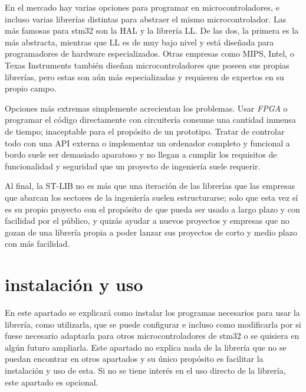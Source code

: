 \documentclass{report}
\begin{document}
En el mercado hay varias opciones para programar en microcontroladores, e incluso varias librerías distintas para abstraer el mismo microcontrolador. Las más famosas para stm32 son la HAL y la librería LL. De las dos, la primera es la más abstracta, mientras que LL es de muy bajo nivel y está diseñada para programadores de hardware especializados. Otras empresas como MIPS, Intel, o Texas Instruments también diseñan microcontroladores que poseen sus propias librerías, pero estas son aún más especializadas y requieren de expertos en su propio campo. \par
Opciones más extremas simplemente acrecientan los problemas. Usar \textit{FPGA} o programar el código directamente con circuitería consume una cantidad inmensa de tiempo; inaceptable para el propósito de un prototipo. Tratar de controlar todo con una API externa o implementar un ordenador completo y funcional a bordo suele ser demasiado aparatoso y no llegan a cumplir los requisitos de funcionalidad y seguridad que un proyecto de ingeniería suele requerir. \par \vspace{0.3cm}
Al final, la ST-LIB no es más que una iteración de las librerías que las empresas que abarcan los sectores de la ingeniería suelen estructurarse; solo que esta vez sí es su propio proyecto con el propósito de que pueda ser usado a largo plazo y con facilidad por el público, y quizás ayudar a nuevos proyectos y empresas que no gozan de una librería propia a poder lanzar sus proyectos de corto y medio plazo con más facilidad. 

\newpage

\section{instalación y uso}
En este apartado se explicará como instalar los programas necesarios para usar la librería, como utilizarla, que se puede configurar e incluso como modificarla por si fuese necesario adaptarla para otros microcontroladores de stm32 o se quisiera en algún futuro ampliarla. Este apartado no explica nada de la librería que no se puedan encontrar en otros apartados y su único propósito es facilitar la instalación y uso de esta. Si no se tiene interés en el uso directo de la librería, este apartado es opcional. 
\end{document}
